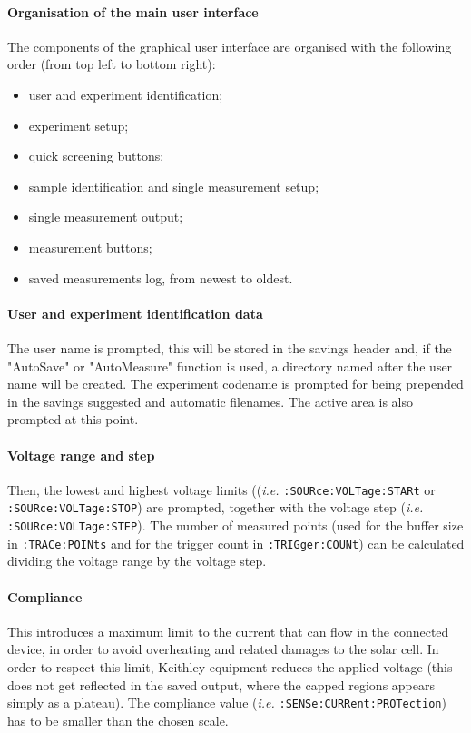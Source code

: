 		\paragraph{Organisation of the main user interface}
		The components of the graphical user interface are organised with the following order (from top left to bottom right):
		\begin{itemize}
			\item user and experiment identification;
			\item experiment setup;
			\item quick screening buttons;
			\item sample identification and single measurement setup;
			\item single measurement output;
			\item measurement buttons;
			\item saved measurements log, from newest to oldest.
		\end{itemize}
		
		
		\paragraph{User and experiment identification data}
		The user name is prompted, this will be stored in the savings header and, if the "AutoSave" or "AutoMeasure" function is used, a directory named after the user name will be created.
		The experiment codename is prompted for being prepended in the savings suggested and automatic filenames.
		The active area is also prompted at this point.

		\paragraph{Voltage range and step}
		Then, the lowest and highest voltage limits ((\textsl{i.e.} \texttt{:SOURce:VOLTage:STARt} or \texttt{:SOURce:VOLTage:STOP}) are prompted, together with the voltage step (\textsl{i.e.} \texttt{:SOURce:VOLTage:STEP}).
		The number of measured points (used for the buffer size in \texttt{:TRACe:POINts} and for the trigger count in \texttt{:TRIGger:COUNt}) can be calculated dividing the voltage range by the voltage step.
		
		\paragraph{Compliance}
		This introduces a maximum limit to the current that can flow in the connected device, in order to avoid overheating and related damages to the solar cell.
		In order to respect this limit, Keithley equipment reduces the applied voltage (this does not get reflected in the saved output, where the capped regions appears simply as a plateau).
		The compliance value (\textsl{i.e.} \texttt{:SENSe:CURRent:PROTection}) has to be smaller than the chosen scale.
		
